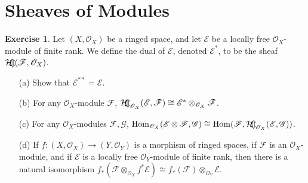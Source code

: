 \documentclass[11pt]{book}
\theoremstyle{definition}
\newtheorem{exercise}{Exercise}[section]
\begin{document}
\section{Sheaves of Modules}
\begin{exercise}
Let $(X,\mathscr{O}_X)$ be a ringed space, and let $\mathscr{E}$ be a locally free $\mathscr{O}_X$-module of finite rank. We define the dual of $\mathscr{E}$, denoted $\mathscr{E}^*$, to be the sheaf $\operatorname{\mathcal{H\mkern-7mu o\mkern-2.5mu m\mkern-1.5mu}}(\mathscr{F},\mathscr{O}_X)$.
\begin{itemize}
\item[(a)] Show that $\mathscr{E}^{**}=\mathscr{E}$.
\item[(b)] For any $\mathscr{O}_X$-module $\mathscr{F}$, $\operatorname{\mathcal{H\mkern-7mu o\mkern-2.5mu m\mkern-1.5mu}}_{\mathscr{O}_X}(\mathscr{E},\mathscr{F})\cong\mathscr{E}^*\otimes_{\mathscr{O}_X}\mathscr{F}$.
\item[(c)] For any $\mathscr{O}_X$-modules $\mathscr{F},\mathscr{G}$, $\mathrm{Hom}_{\mathscr{O}_X}(\mathscr{E}\otimes\mathscr{F},\mathscr{G})\cong\mathrm{Hom}(\mathscr{F},\operatorname{\mathcal{H\mkern-7mu o\mkern-2.5mu m\mkern-1.5mu}}_{\mathscr{O}_X}(\mathscr{E},\mathscr{G}))$.
\item[(d)] If $f:(X,\mathscr{O}_X)\to (Y,\mathscr{O}_Y)$ is a morphism of ringed spaces, if $\mathscr{F}$ is an $\mathscr{O}_X$-module, and if $\mathscr{E}$ is a locally free $\mathscr{O}_Y$-module of finite rank, then there is a natural isomorphism $f_*(\mathscr{F}\otimes_{\mathscr{O}_X}f^*\mathscr{E})\cong f_*(\mathscr{F})\otimes_{\mathscr{O}_Y}\mathscr{E}$. 
\end{itemize}
\end{exercise}
\end{document}
